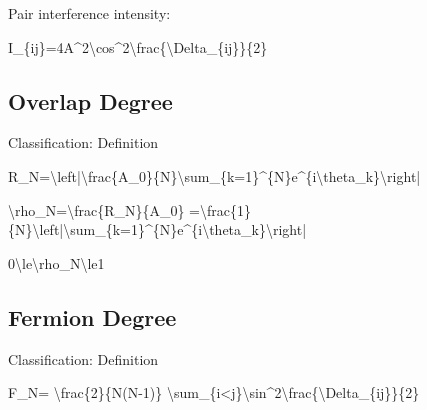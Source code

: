 \documentclass[
  a4paper]{article}
\newenvironment{Shaded}{}{}
\newcommand{\NormalTok}[1]{#1}
\begin{document}
Pair interference intensity:

\begin{Shaded}
\begin{Highlighting}[]
\NormalTok{I\_\{ij\}=4A\^{}2\textbackslash{}cos\^{}2\textbackslash{}frac\{\textbackslash{}Delta\_\{ij\}\}\{2\}}
\end{Highlighting}
\end{Shaded}

\subsection{Overlap Degree}\label{overlap-degree}

Classification: Definition

\begin{Shaded}
\begin{Highlighting}[]
\NormalTok{R\_N=\textbackslash{}left|\textbackslash{}frac\{A\_0\}\{N\}\textbackslash{}sum\_\{k=1\}\^{}\{N\}e\^{}\{i\textbackslash{}theta\_k\}\textbackslash{}right|}
\end{Highlighting}
\end{Shaded}

\begin{Shaded}
\begin{Highlighting}[]
\NormalTok{\textbackslash{}rho\_N=\textbackslash{}frac\{R\_N\}\{A\_0\}}
\NormalTok{=\textbackslash{}frac\{1\}\{N\}\textbackslash{}left|\textbackslash{}sum\_\{k=1\}\^{}\{N\}e\^{}\{i\textbackslash{}theta\_k\}\textbackslash{}right|}
\end{Highlighting}
\end{Shaded}

\begin{Shaded}
\begin{Highlighting}[]
\NormalTok{0\textbackslash{}le\textbackslash{}rho\_N\textbackslash{}le1}
\end{Highlighting}
\end{Shaded}

\subsection{Fermion Degree}\label{fermion-degree}

Classification: Definition

\begin{Shaded}
\begin{Highlighting}[]
\NormalTok{F\_N=}
\NormalTok{\textbackslash{}frac\{2\}\{N(N{-}1)\}}
\NormalTok{\textbackslash{}sum\_\{i\textless{}j\}\textbackslash{}sin\^{}2\textbackslash{}frac\{\textbackslash{}Delta\_\{ij\}\}\{2\}}
\end{Highlighting}
\end{Shaded}
\end{document}
